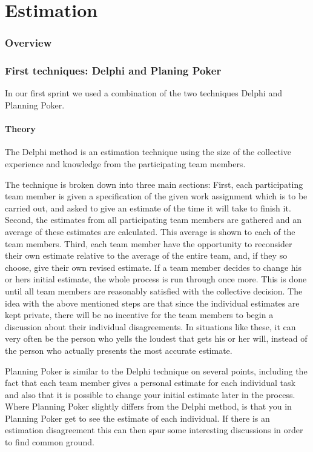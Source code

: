 \part{Estimation}
\section{Overview}
\section{First techniques: Delphi and Planing Poker}
In our first sprint we used a combination of the two techniques Delphi and Planning Poker.

\subsection{Theory}


The Delphi method is an estimation technique using the size of the collective experience and knowledge from the participating team members.

The technique is broken down into three main sections:
First, each participating team member is given a specification of the given work assignment which is to be carried out, and asked to give an estimate of the time it will take to finish it.
Second, the estimates from all participating team members are gathered and an average of these estimates are calculated. This average is shown to each of the team members.
Third, each team member have the opportunity to reconsider their own estimate relative to the average of the entire team, and, if they so choose, give their own revised estimate.
If a team member decides to change his or hers initial estimate, the whole process is run through once more. This is done until all team members are reasonably satisfied with the collective decision. 
The idea with the above mentioned steps are that since the individual estimates are kept private, there will be no incentive for the team members to begin a discussion about their individual disagreements. In situations like these, it can very often be the person who yells the loudest that gets his or her will, instead of the person who actually presents the most accurate estimate.


Planning Poker is similar to the Delphi technique on several points, including the fact that each team member gives a personal estimate for each individual task and also that it is possible to change your initial estimate later in the process. Where Planning Poker slightly differs from the Delphi method, is that you in Planning Poker get to see the estimate of each individual. If there is an estimation disagreement this can then spur some interesting discussions in order to find common ground. 

